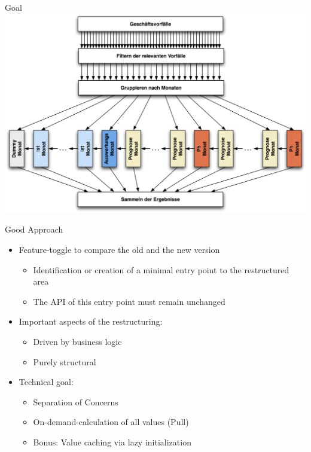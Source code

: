 \begin{frame}[fragile]{Goal}
\includegraphics[width=.85 \paperwidth]{DynamischFein.jpg}
\end{frame}


\begin{frame}[fragile]{Good Approach}
\begin{itemize}
\item Feature-toggle to compare the old and the new version
\begin{itemize}
\item Identification or creation of a minimal entry point to the restructured area
\item The API of this entry point must remain unchanged
\end{itemize}
\end{itemize}

\begin{itemize}
\item Important aspects of the restructuring:
\begin{itemize}
\item Driven by business logic
\item Purely structural
\end{itemize}
\end{itemize}

\begin{itemize}
\item Technical goal:
\begin{itemize}
\item Separation of Concerns
\item On-demand-calculation of all values (\glqq Pull\grqq{})
\item Bonus: Value caching via lazy initialization
\end{itemize}

\end{itemize}
\end{frame}

